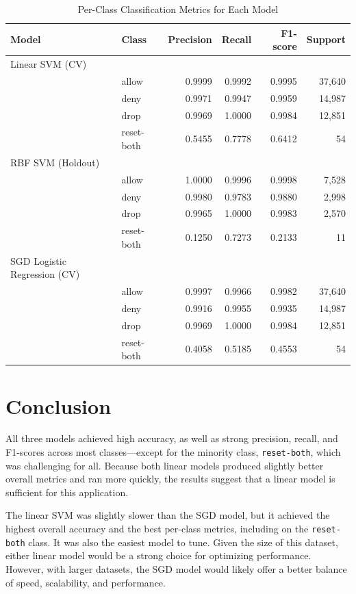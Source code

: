 \documentclass{article}      %
\begin{document}
\begin{table}[H]
    \centering
    \caption{Per-Class Classification Metrics for Each Model}
    \begin{tabular}{llrrrr}
    \arrayrulecolor{black}
    \toprule
    \textbf{Model} & \textbf{Class} & \textbf{Precision} & \textbf{Recall} & \textbf{F1-score} & \textbf{Support} \\
    \midrule
    Linear SVM (CV) & & & & & \\
    & allow       & 0.9999 & 0.9992 & 0.9995 & 37{,}640 \\
    & deny        & 0.9971 & 0.9947 & 0.9959 & 14{,}987 \\
    & drop        & 0.9969 & 1.0000 & 0.9984 & 12{,}851 \\
    & reset-both  & 0.5455 & 0.7778 & 0.6412 & 54 \\
    \midrule
    RBF SVM (Holdout) & & & & & \\
    & allow       & 1.0000 & 0.9996 & 0.9998 & 7{,}528 \\
    & deny        & 0.9980 & 0.9783 & 0.9880 & 2{,}998 \\
    & drop        & 0.9965 & 1.0000 & 0.9983 & 2{,}570 \\
    & reset-both  & 0.1250 & 0.7273 & 0.2133 & 11 \\
    \midrule
    SGD Logistic Regression (CV) & & & & & \\
    & allow       & 0.9997 & 0.9966 & 0.9982 & 37{,}640 \\
    & deny        & 0.9916 & 0.9955 & 0.9935 & 14{,}987 \\
    & drop        & 0.9969 & 1.0000 & 0.9984 & 12{,}851 \\
    & reset-both  & 0.4058 & 0.5185 & 0.4553 & 54 \\
    \bottomrule
    \end{tabular}
\label{table:metrics_by_class}
\end{table}

\section{Conclusion}

All three models achieved high accuracy, as well as strong precision, recall, and F1-scores across most classes---except for the minority class, \texttt{reset-both}, which was challenging for all. Because both linear models produced slightly better overall metrics and ran more quickly, the results suggest that a linear model is sufficient for this application.

The linear SVM was slightly slower than the SGD model, but it achieved the highest overall accuracy and the best per-class metrics, including on the \texttt{reset-both} class. It was also the easiest model to tune. Given the size of this dataset, either linear model would be a strong choice for optimizing performance. However, with larger datasets, the SGD model would likely offer a better balance of speed, scalability, and performance.
\end{document}
